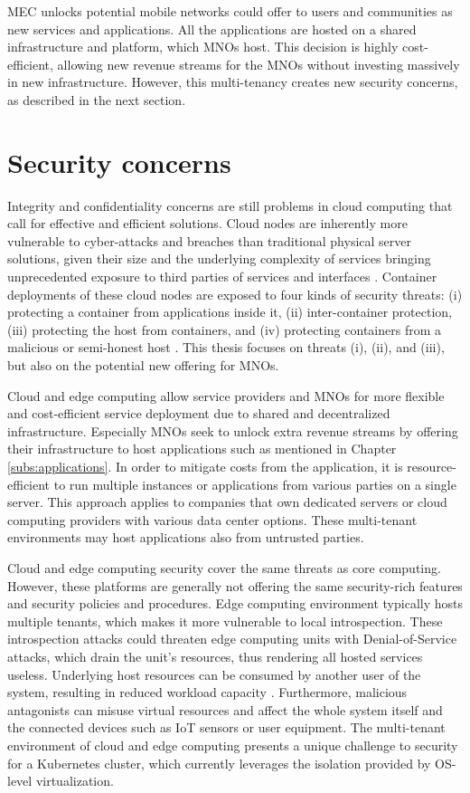 MEC unlocks potential mobile networks could offer to users and communities as new services and applications. All the applications are hosted on a shared infrastructure and platform, which MNOs host. This decision is highly cost-efficient, allowing new revenue streams for the MNOs without investing massively in new infrastructure. However, this multi-tenancy creates new security concerns, as described in the next section.

\section{Security concerns}
\label{section:security}

Integrity and confidentiality concerns are still problems in cloud computing that call for effective and efficient solutions. Cloud nodes are inherently more vulnerable to cyber-attacks and breaches than traditional physical server solutions, given their size and the underlying complexity of services bringing unprecedented exposure to third parties of services and interfaces \cite{Lombardi2011}. Container deployments of these cloud nodes are exposed to four kinds of security threats: (i) protecting a container from applications inside it, (ii) inter-container protection, (iii) protecting the host from containers, and (iv) protecting containers from a malicious or semi-honest host \cite{Flauzac2020}. This thesis focuses on threats (i), (ii), and (iii), but also on the potential new offering for MNOs.

Cloud and edge computing allow service providers and MNOs for more flexible and cost-efficient service deployment due to shared and decentralized infrastructure. Especially MNOs seek to unlock extra revenue streams by offering their infrastructure to host applications such as mentioned in Chapter \ref{subs:applications}. In order to mitigate costs from the application, it is resource-efficient to run multiple instances or applications from various parties on a single server. This approach applies to companies that own dedicated servers or cloud computing providers with various data center options. These multi-tenant environments may host applications also from untrusted parties.

Cloud and edge computing security cover the same threats as core computing. However, these platforms are generally not offering the same security-rich features and security policies and procedures. Edge computing environment typically hosts multiple tenants, which makes it more vulnerable to local introspection. These introspection attacks could threaten edge computing units with Denial-of-Service attacks, which drain the unit's resources, thus rendering all hosted services useless. Underlying host resources can be consumed by another user of the system, resulting in reduced workload capacity \cite{Edwards2019}. Furthermore, malicious antagonists can misuse virtual resources and affect the whole system itself and the connected devices such as IoT sensors or user equipment. The multi-tenant environment of cloud and edge computing presents a unique challenge to security for a Kubernetes cluster, which currently leverages the isolation provided by OS-level virtualization. \cite{EdgeComputing5G}\cite{Abbas2018}

